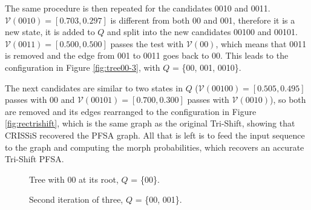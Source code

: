 {The same procedure is then repeated for the candidates 0010 and 0011. $\mathcal{V}(0010) = [0.703, 0.297]$ is different from both 00 and 001, therefore it is a new state, it is added to $Q$ and split into the new candidates 00100 and 00101. $\mathcal{V}(0011) = [0.500, 0.500]$ passes the test with $\mathcal{V}(00)$, which means that 0011 is removed and the edge from 001 to 0011 goes back to 00. This leads to the configuration in Figure \ref{fig:tree00-3}, with $Q$ = \{00, 001, 0010\}.

The next candidates are similar to two states in $Q$ ($\mathcal{V}(00100) = [0.505, 0.495]$ passes with 00 and $\mathcal{V}(00101) = [0.700, 0.300]$ passes with $\mathcal{V}(0010)$), so both are removed and its edges rearranged to the configuration in Figure \ref{fig:rectrishift}, which is the same graph as the original Tri-Shift, showing that CRISSiS recovered the PFSA graph. All that is left is to feed the input sequence to the graph and computing the morph probabilities, which recovers an accurate Tri-Shift PFSA.

\begin{figure}[t]
\centering
{}
\caption{Tree with 00 at its root, $Q$ = \{00\}. \label{fig:tree00}}
\end{figure}

\begin{figure}
\centering
{}
\caption{Second iteration of three, $Q$ = \{00, 001\}.\label{fig:tree00-2}}
\end{figure}

}
